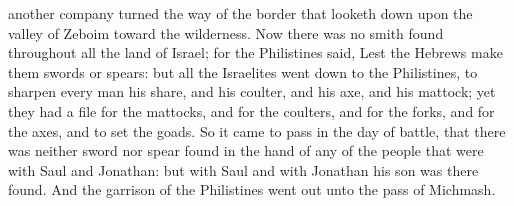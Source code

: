 another company turned the way of the border that looketh down upon the valley of Zeboim toward the wilderness.  Now there was no smith found throughout all the land of Israel; for the Philistines said, Lest the Hebrews make them swords or spears: but all the Israelites went down to the Philistines, to sharpen every man his share, and his coulter, and his axe, and his mattock; yet they had a file for the mattocks, and for the coulters, and for the forks, and for the axes, and to set the goads. So it came to pass in the day of battle, that there was neither sword nor spear found in the hand of any of the people that were with Saul and Jonathan: but with Saul and with Jonathan his son was there found. And the garrison of the Philistines went out unto the pass of Michmash. 

